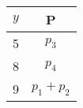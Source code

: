 \begin{tabular}{|c|c|}
\hline
 $y$ & P     \\ \hline
5 & $p_3$ \\ \hline
8 & $p_4$ \\ \hline
9 & $p_1 + p_2$ \\ \hline
\end{tabular}